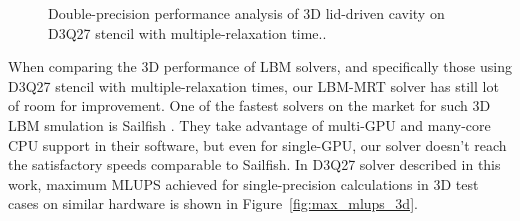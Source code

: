 \begin{figure}[!ht]
	\centering
	\qquad
	\qquad
	\qquad
	\captionsetup{justification=centering}
	\caption{Double-precision performance analysis of 3D lid-driven cavity on D3Q27 stencil with multiple-relaxation time..}
	\label{fig:d3q27_lid_mlups_f64}
\end{figure}

When comparing the 3D performance of LBM solvers, and specifically those using D3Q27 stencil with multiple-relaxation times, our LBM-MRT solver has still lot of room for improvement. One of the fastest solvers on the market for such 3D LBM smulation is Sailfish \cite{januszewskiSailfishFlexibleMultiGPU2014}. They take advantage of multi-GPU and many-core CPU support in their software, but even for single-GPU, our solver doesn't reach the satisfactory speeds comparable to Sailfish. In D3Q27 solver described in this work, maximum MLUPS achieved for single-precision calculations in 3D test cases on similar hardware is shown in Figure~\ref{fig:max_mlups_3d}. 

